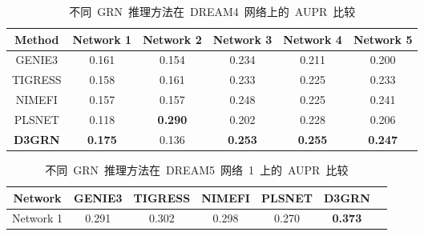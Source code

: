 \begin{table}[!htbp]
  \centering
  \begin{threeparttable}  
  \caption{不同~GRN~推理方法在~DREAM4~网络上的~AUPR~比较}

  \label{tab:performance_dr4} 
    \begin{tabular}{cccccc}  
    \toprule  
    Method
     & Network 1&  Network 2&  Network 3&  Network 4 & Network 5\\
    \midrule  
    GENIE3  &0.161   &0.154           &0.234      &0.211          &0.200                 \\
    TIGRESS &0.158   &0.161           &0.233      &0.225          &0.233                \\
    NIMEFI  &0.157   &0.157           &0.248      &0.225          &0.241                \\
    PLSNET  &0.118   &\textbf{0.290}  &0.202      &0.228          &0.206                \\
    \textbf{D3GRN}   &\textbf{0.175}  &0.136      &\textbf{0.253} &\textbf{0.255}       &\textbf{0.247}  \\
    \bottomrule  
    \end{tabular}  
   \end{threeparttable}
\end{table} 

\begin{table}[!htbp]
  \begin{threeparttable}  
  \caption{不同~GRN~推理方法在~DREAM5~网络~1~上的~AUPR~比较}

  \label{tab:performance_dr5} 
    \begin{tabular}{ccccccc}  
    \toprule  
    Network&GENIE3 &TIGRESS &NIMEFI  &PLSNET &\textbf{D3GRN}\\
    \midrule  
    Network 1&0.291 &0.302 &0.298 &0.270  &\textbf{0.373}\\
    \bottomrule  
    \end{tabular}  
    \end{threeparttable}
\end{table} 


